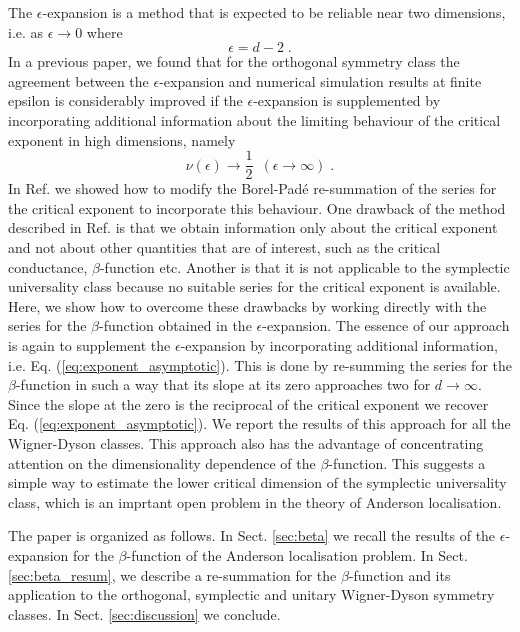 \documentclass[singlecolumn]{jpsj3}
\begin{document}
The $\epsilon$-expansion is a method that is expected to be reliable near two dimensions, i.e. as $\epsilon  \rightarrow 0$ where
\begin{equation}
  \epsilon = d-2 \;.
\end{equation}
In a previous paper\cite{Ueoka14}, we found that for the orthogonal symmetry class the agreement between the $\epsilon$-expansion and numerical simulation results at finite epsilon is considerably improved if the
$\epsilon$-expansion is supplemented by incorporating additional information about the limiting behaviour of the critical exponent in high dimensions, namely
\begin{equation}\label{eq:exponent_asymptotic}
  \nu \left( \epsilon \right) \rightarrow \frac{1}{2} \,\,\, (\epsilon \rightarrow   \infty) \;.
\end{equation}
In Ref.  we showed how to modify the Borel-Pad\'{e} re-summation of the series for the critical exponent to incorporate this behaviour.
One drawback of the method described in Ref.  is that we obtain information only
about the critical exponent and not about other quantities that are of interest, such as the critical
conductance, $\beta$-function etc.
Another is that it is not applicable to the symplectic universality class because no suitable series for the critical exponent is available.
Here, we show how to overcome these drawbacks by working directly with the series for the $\beta$-function obtained in the $\epsilon$-expansion.
The essence of our approach is again to supplement the $\epsilon$-expansion by incorporating additional information, i.e. Eq. (\ref{eq:exponent_asymptotic}).
This is done by re-summing the series for the $\beta$-function in such a way that its slope at its zero approaches two for $d\rightarrow\infty$.
Since the slope at the zero is the reciprocal of the critical exponent we recover Eq. (\ref{eq:exponent_asymptotic}).
We report the results of this approach for all the Wigner-Dyson classes.
This approach also has the advantage of concentrating attention on the dimensionality dependence of the $\beta$-function.
This suggests a simple way to estimate the lower critical dimension of the symplectic universality class, which is an imprtant open problem in the theory of Anderson localisation.

The paper is organized as follows.
In Sect. \ref{sec:beta} we recall the results of the $\epsilon$-expansion for the $\beta$-function of the Anderson localisation problem.
In Sect. \ref{sec:beta_resum}, we describe a re-summation for the $\beta$-function and its application
to the orthogonal, symplectic and unitary Wigner-Dyson symmetry classes.
In Sect. \ref{sec:discussion} we conclude.
\end{document}
